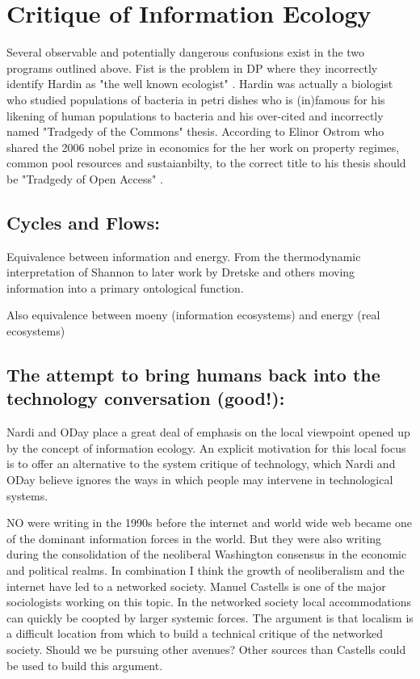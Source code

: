 \section{Critique of Information Ecology}

Several observable and potentially dangerous confusions exist in the two programs outlined above. Fist is the problem in DP where they incorrectly identify Hardin as "the well known ecologist" \cite[][p. 28]{davenport_information_1997}. Hardin was actually a biologist who studied populations of bacteria in petri dishes who is (in)famous for his likening of human populations to bacteria and his over-cited and incorrectly named "Tradgedy of the Commons" thesis. According to Elinor Ostrom who shared the 2006 nobel prize in economics for the her work on property regimes, common pool resources and sustaianbilty, to the correct title to his thesis should be "Tradgedy of Open Access" \cite{ostrom_2007}.

\subsection{Cycles and Flows:}

Equivalence between information and energy. From the thermodynamic interpretation of Shannon to later work by Dretske and others moving information into a primary ontological function.

Also equivalence between moeny (information ecosystems) and energy (real ecosystems)

\subsection{The attempt to bring humans back into the technology conversation (good!):}

Nardi and ODay place a great deal of emphasis on the local viewpoint opened up by the concept of information ecology. An explicit motivation for this local focus is to offer an alternative to the system critique of technology, which Nardi and ODay believe ignores the ways in which people may intervene in technological systems.

NO were writing in the 1990s before the internet and world wide web became one of the dominant information forces in the world. But they were also writing during the consolidation of the neoliberal Washington consensus in the economic and political realms. In combination I think the growth of neoliberalism and the internet have led to a networked society. Manuel Castells is one of the major sociologists working on this topic. In the networked society local accommodations can quickly be coopted by larger systemic forces. The argument is that localism is a difficult location from which to build a technical critique of the networked society. Should we be pursuing other avenues? Other sources than Castells could be used to build this argument.

